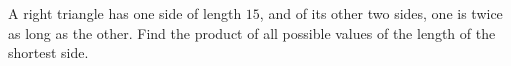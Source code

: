 A right triangle has one side of length $15$, and of its other two sides, one is twice as long as the other. Find the product of all possible values of the length of the shortest side.
